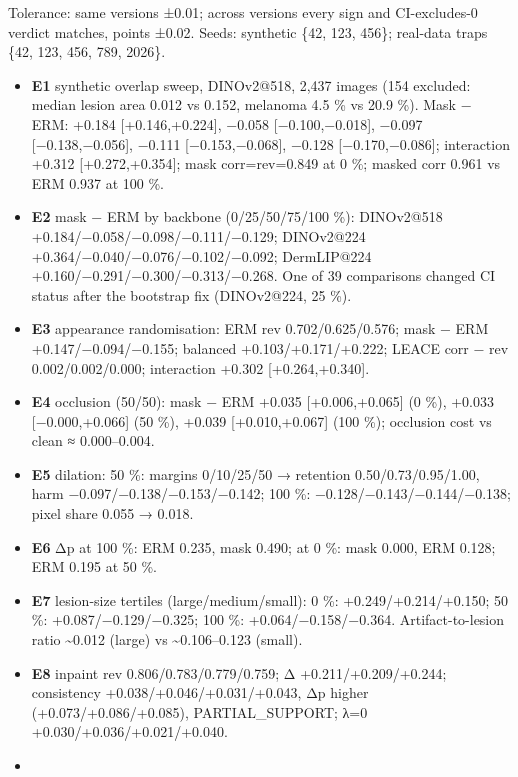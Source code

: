 {Tolerance: same versions ±0.01; across versions every sign and CI-excludes-0 verdict matches, points ±0.02.
Seeds: synthetic \{42, 123, 456\}; real-data traps \{42, 123, 456, 789, 2026\}.

\begin{itemize}

\item
  \textbf{E1} synthetic overlap sweep, DINOv2@518, 2,437 images (154 excluded: median lesion area 0.012 vs 0.152,
  melanoma 4.5 \% vs 20.9 \%). Mask − ERM: +0.184 {[}+0.146,+0.224{]}, −0.058 {[}−0.100,−0.018{]}, −0.097 {[}−0.138,−0.056{]},
  −0.111 {[}−0.153,−0.068{]}, −0.128 {[}−0.170,−0.086{]}; interaction +0.312 {[}+0.272,+0.354{]}; mask corr=rev=0.849 at 0 \%;
  masked corr 0.961 vs ERM 0.937 at 100 \%.
\item
  \textbf{E2} mask − ERM by backbone (0/25/50/75/100 \%): DINOv2@518 +0.184/−0.058/−0.098/−0.111/−0.129;
  DINOv2@224 +0.364/−0.040/−0.076/−0.102/−0.092; DermLIP@224 +0.160/−0.291/−0.300/−0.313/−0.268.
  One of 39 comparisons changed CI status after the bootstrap fix (DINOv2@224, 25 \%).
\item
  \textbf{E3} appearance randomisation: ERM rev 0.702/0.625/0.576; mask − ERM +0.147/−0.094/−0.155; balanced
  +0.103/+0.171/+0.222; LEACE \textbar corr − rev\textbar{} 0.002/0.002/0.000; interaction +0.302 {[}+0.264,+0.340{]}.
\item
  \textbf{E4} occlusion (50/50): mask − ERM +0.035 {[}+0.006,+0.065{]} (0 \%), +0.033 {[}−0.000,+0.066{]} (50 \%),
  +0.039 {[}+0.010,+0.067{]} (100 \%); occlusion cost vs clean ≈ 0.000--0.004.
\item
  \textbf{E5} dilation: 50 \%: margins 0/10/25/50 → retention 0.50/0.73/0.95/1.00, harm −0.097/−0.138/−0.153/−0.142;
  100 \%: −0.128/−0.143/−0.144/−0.138; pixel share 0.055 → 0.018.
\item
  \textbf{E6} \textbar Δp\textbar{} at 100 \%: ERM 0.235, mask 0.490; at 0 \%: mask 0.000, ERM 0.128; ERM 0.195 at 50 \%.
\item
  \textbf{E7} lesion-size tertiles (large/medium/small): 0 \%: +0.249/+0.214/+0.150; 50 \%: +0.087/−0.129/−0.325;
  100 \%: +0.064/−0.158/−0.364. Artifact-to-lesion ratio \textasciitilde0.012 (large) vs \textasciitilde0.106--0.123 (small).
\item
  \textbf{E8} inpaint rev 0.806/0.783/0.779/0.759; Δ +0.211/+0.209/+0.244; consistency +0.038/+0.046/+0.031/+0.043,
  \textbar Δp\textbar{} higher (+0.073/+0.086/+0.085), PARTIAL\_SUPPORT; λ=0 +0.030/+0.036/+0.021/+0.040.
\item

\end{itemize}}
